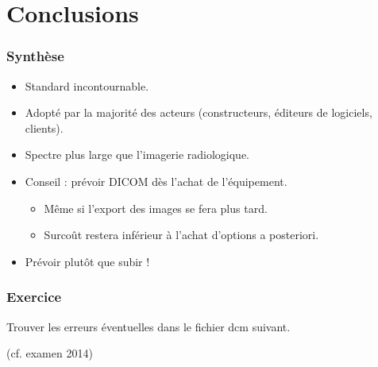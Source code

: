 \section{Conclusions}

\frame
{
	\frametitle{Synth\`ese}
	
	\begin{itemize}
		\item Standard incontournable.
		\item<2-> Adopt\'e par la majorit\'e des acteurs (constructeurs, \'editeurs de logiciels, clients).
		\item<3-> Spectre plus large que l'imagerie radiologique.
		\item<4-> Conseil : pr\'evoir DICOM d\`es l'achat de l'\'equipement.
		\begin{itemize}
			\item<5-> M\^eme si l'export des images se fera plus tard.
			\item<6-> Surco\^ut restera inf\'erieur \`a l'achat d'options a posteriori.
		\end{itemize}
		\item<7-> Pr\'evoir plut\^ot que subir !
	\end{itemize}
}

\frame
{
    \frametitle{Exercice}
    Trouver les erreurs éventuelles dans le fichier dcm suivant.

    (cf. examen 2014)
}


